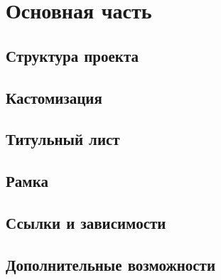 \section{ Основная часть}
	\subsection{Структура проекта}
	\subsection{Кастомизация}
	\subsection{Титульный лист}
	\subsection{Рамка}
	\subsection{Ссылки и зависимости}
	\subsection{Дополнительные возможности}
